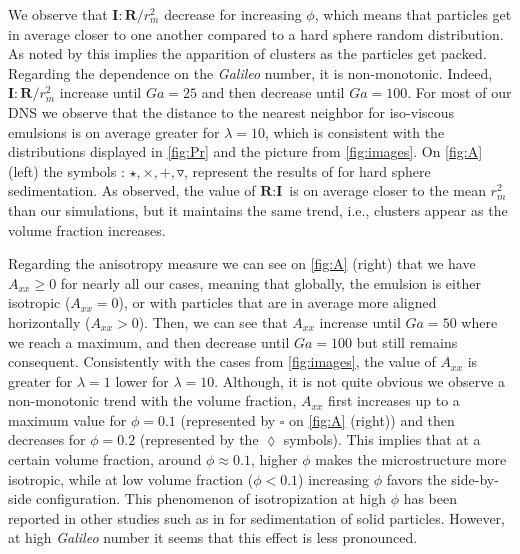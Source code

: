 We observe that $\textbf{I}:\textbf{R}/r_m^2$  decrease for increasing $\phi$, which means that particles get in average closer to one another compared to a hard sphere random distribution. 
As noted by \citet{zhang2023evolution} this implies the apparition of clusters as the particles get packed. 
Regarding the dependence on the \textit{Galileo} number, it is non-monotonic. 
Indeed, $\textbf{I}:\textbf{R}/r_m^2$ increase until $Ga = 25$ and then decrease until $Ga = 100$.  
For most of our DNS we observe that the distance to the nearest neighbor for iso-viscous emulsions is on average greater for $\lambda = 10$, which is consistent with the distributions displayed in \ref{fig:Pr} and the picture from \ref{fig:images}.  
On \ref{fig:A} (left) the symbols : $\pmb\star, \pmb\times,\pmb +, \pmb\triangledown$, represent the results of \citet{zhang2023evolution} for hard sphere sedimentation. 
As observed, the value of $\textbf{R}:\textbf{I}$ is on average closer to the mean $r_m^2$ than our simulations, but it maintains the same trend, i.e., clusters appear as the volume fraction increases.

 
Regarding the anisotropy measure we can see on \ref{fig:A} (right) that we have $A_{xx} \ge 0$ for nearly all our cases, meaning that globally, the emulsion is either isotropic ($A_{xx} = 0$), or with particles that are in average more aligned horizontally ($A_{xx} >0$). 
Then, we can see that $A_{xx}$ increase until $Ga = 50$ where we reach a maximum, and then decrease until $Ga =100$  but still remains consequent. 
Consistently with the cases from \ref{fig:images}, the value of $A_{xx}$ is greater for $\lambda = 1$ lower for  $\lambda = 10$.
Although, it is not quite obvious we observe a non-monotonic trend with the volume fraction, $A_{xx}$ first increases up to a maximum value for $\phi =0.1$ (represented by \textcolor{col3}{$\pmb\square$} on \ref{fig:A} (right)) and then decreases for $\phi=0.2$ (represented by the \textcolor{col4}{$\pmb\lozenge$} symbols). 
This implies that at a certain volume fraction, around $\phi \approx 0.1$, higher $\phi$ makes the microstructure more isotropic, while at low volume fraction ($\phi < 0.1$) increasing $\phi$ favors the side-by-side configuration.
This phenomenon of isotropization at high $\phi$ has been reported in other studies such as in \citet{seyed2021sedimentation} for sedimentation of solid particles. 
However, at high \textit{Galileo} number it seems that this effect is less pronounced. 


